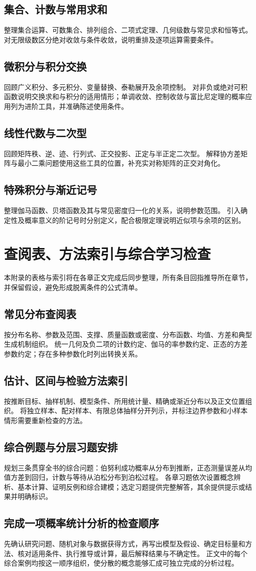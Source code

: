 \documentclass[UTF8,12pt,a4paper,fontset=fandol]{ctexbook}
\begin{document}
\section{集合、计数与常用求和}
整理集合运算、可数集合、排列组合、二项式定理、几何级数与常见求和恒等式。
对无限级数区分绝对收敛与条件收敛，说明重排及逐项运算需要条件。

\section{微积分与积分交换}
回顾广义积分、多元积分、变量替换、泰勒展开及余项控制。
对非负或绝对可积函数说明交换求和与积分的适用情形；单调收敛、控制收敛与富比尼定理的概率应用列为进阶工具，并准确陈述使用条件。

\section{线性代数与二次型}
回顾矩阵秩、逆、迹、行列式、正交投影、正定与半正定二次型。
解释协方差矩阵与最小二乘问题使用这些工具的位置，补充实对称矩阵的正交对角化。

\section{特殊积分与渐近记号}
整理伽马函数、贝塔函数及其与常见密度归一化的关系，说明参数范围。
引入确定性及概率意义的阶记号时分别定义，配合极限定理说明近似项与余项的区别。


\chapter{查阅表、方法索引与综合学习检查}
\label{app:ps-reference}

本附录的表格与索引将在各章正文完成后同步整理，所有条目回指推导所在章节，并保留假设，避免形成脱离条件的公式清单。

\section{常见分布查阅表}
按分布名称、参数及范围、支撑、质量函数或密度、分布函数、均值、方差和典型生成机制组织。
统一几何及负二项的计数约定、伽马的率参数约定、正态的方差参数约定；存在多种参数化时列出转换关系。

\section{估计、区间与检验方法索引}
按推断目标、抽样机制、模型条件、所用统计量、精确或渐近分布以及正文位置组织。
将独立样本、配对样本、有限总体抽样分开列示，并标注边界参数和小样本情形需要重新检查的方法。

\section{综合例题与分层习题安排}
规划三条贯穿全书的综合问题：伯努利成功概率从分布到推断，正态测量误差从均值方差到回归，计数与等待从泊松分布到泊松过程。
各章习题依次设置概念辨析、基本计算、证明反例和综合建模；选定习题提供完整解答，其余提供提示或结果并明确标识。

\section{完成一项概率统计分析的检查顺序}
先确认研究问题、随机对象与数据获得方式，再写出模型及假设、确定目标量和方法、核对适用条件、执行推导或计算，最后解释结果与不确定性。
正文中的每个综合案例均按这一顺序组织，使分散的概念能够汇成可独立完成的分析过程。
\end{document}
